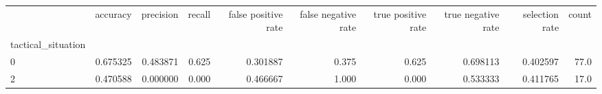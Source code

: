 \begin{tabular}{lrrrrrrrrr}
\toprule
{} &  accuracy &  precision &  recall &  false positive rate &  false negative rate &  true positive rate &  true negative rate &  selection rate &  count \\
tactical\_situation &           &            &         &                      &                      &                     &                     &                 &        \\
\midrule
0                  &  0.675325 &   0.483871 &   0.625 &             0.301887 &                0.375 &               0.625 &            0.698113 &        0.402597 &   77.0 \\
2                  &  0.470588 &   0.000000 &   0.000 &             0.466667 &                1.000 &               0.000 &            0.533333 &        0.411765 &   17.0 \\
\bottomrule
\end{tabular}
